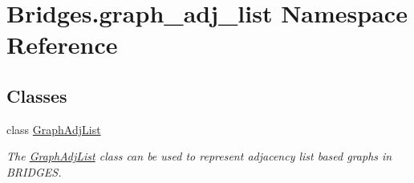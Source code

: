 \hypertarget{namespace_bridges_1_1graph__adj__list}{}\section{Bridges.\+graph\+\_\+adj\+\_\+list Namespace Reference}
\label{namespace_bridges_1_1graph__adj__list}
\subsection*{Classes}
\begin{DoxyCompactItemize}
\item 
class \hyperlink{class_bridges_1_1graph__adj__list_1_1_graph_adj_list}{Graph\+Adj\+List}
\begin{DoxyCompactList}\small\item\em The \hyperlink{class_bridges_1_1graph__adj__list_1_1_graph_adj_list}{Graph\+Adj\+List} class can be used to represent adjacency list based graphs in B\+R\+I\+D\+G\+E\+S. \end{DoxyCompactList}\end{DoxyCompactItemize}
